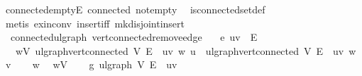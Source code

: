 \begin{isabellebody}
\ connected{\isacharunderscore}{\kern0pt}empty{\isacharunderscore}{\kern0pt}E\ connected\ not{\isacharunderscore}{\kern0pt}empty\ \isamarkupfalse%
\ is{\isacharunderscore}{\kern0pt}connected{\isacharunderscore}{\kern0pt}set{\isacharunderscore}{\kern0pt}def\isanewline
\ \ \isamarkupfalse%
\ {\isacharparenleft}{\kern0pt}metis\ ex{\isacharunderscore}{\kern0pt}in{\isacharunderscore}{\kern0pt}conv\ insert{\isacharunderscore}{\kern0pt}iff\ mk{\isacharunderscore}{\kern0pt}disjoint{\isacharunderscore}{\kern0pt}insert{\isacharparenright}{\kern0pt}%
\endisatagproof
{\isafoldproof}%
%
\isadelimproof
\isanewline
%
\endisadelimproof
\isanewline
{}\isamarkupfalse%
\ {\isacharparenleft}{\kern0pt}\ connected{\isacharunderscore}{\kern0pt}ulgraph{\isacharparenright}{\kern0pt}\ vert{\isacharunderscore}{\kern0pt}connected{\isacharunderscore}{\kern0pt}remove{\isacharunderscore}{\kern0pt}edge{\isacharcolon}{\kern0pt}\isanewline
\ \ \ e{\isacharcolon}{\kern0pt}\ {\isachardoublequoteopen}{\isacharbraceleft}{\kern0pt}u{\isacharcomma}{\kern0pt}v{\isacharbraceright}{\kern0pt}\ {\isasymin}\ E{\isachardoublequoteclose}\isanewline
\ \ \ {\isachardoublequoteopen}{\isasymforall}w{\isasymin}V{\isachardot}{\kern0pt}\ ulgraph{\isachardot}{\kern0pt}vert{\isacharunderscore}{\kern0pt}connected\ V\ {\isacharparenleft}{\kern0pt}E\ {\isacharminus}{\kern0pt}\ {\isacharbraceleft}{\kern0pt}{\isacharbraceleft}{\kern0pt}u{\isacharcomma}{\kern0pt}v{\isacharbraceright}{\kern0pt}{\isacharbraceright}{\kern0pt}{\isacharparenright}{\kern0pt}\ w\ u\ {\isasymor}\ ulgraph{\isachardot}{\kern0pt}vert{\isacharunderscore}{\kern0pt}connected\ V\ {\isacharparenleft}{\kern0pt}E\ {\isacharminus}{\kern0pt}\ {\isacharbraceleft}{\kern0pt}{\isacharbraceleft}{\kern0pt}u{\isacharcomma}{\kern0pt}v{\isacharbraceright}{\kern0pt}{\isacharbraceright}{\kern0pt}{\isacharparenright}{\kern0pt}\ w\ v{\isachardoublequoteclose}\isanewline
%
\isadelimproof
%
\endisadelimproof
%
\isatagproof
{}\isamarkupfalse%
\isanewline
\ \ \isamarkupfalse%
\ w\ \isamarkupfalse%
\ {\isachardoublequoteopen}w{\isasymin}V{\isachardoublequoteclose}\isanewline
\ \ \isamarkupfalse%
\ g{\isacharprime}{\kern0pt}{\isacharcolon}{\kern0pt}\ ulgraph\ V\ {\isachardoublequoteopen}E\ {\isacharminus}{\kern0pt}\ {\isacharbraceleft}{\kern0pt}{\isacharbraceleft}{\kern0pt}u{\isacharcomma}{\kern0pt}v{\isacharbraceright}{\kern0pt}{\isacharbraceright}{\kern0pt}{\isachardoublequoteclose}\ \isamarkupfalse%

\end{isabellebody}
